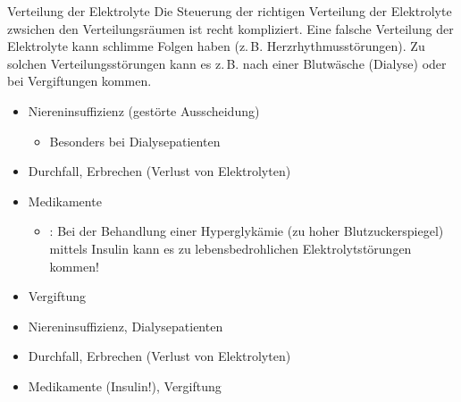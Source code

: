 \documentclass[
ngerman,
paper=a4,
asymmetric,
fontsize=10pt,
draft=false,
numbers=noenddot,
bibtotocnumbered,
footnotes=multiple,
]{scrreprt}
\begin{document}
{Verteilung der Elektrolyte}
{%
Die Steuerung der richtigen Verteilung der
Elektrolyte zwsichen den Verteilungsräumen ist recht
kompliziert.%
% 
Eine
falsche Verteilung der Elektrolyte kann schlimme Folgen
haben (z.\,B. Herzrhythmusstörungen). Zu solchen
Verteilungsstörungen kann es z.\,B. nach einer Blutwäsche
(Dialyse) oder bei Vergiftungen kommen.
 }
{}
{}
{}
{}
 
 
 {%
 \label{topic:elektrolytstoerungen}
 \label{topic:dialyse-elektrolyte}
 \begin{itemize}
     \item Niereninsuffizienz (gestörte Ausscheidung)
     \begin{itemize}
         \item Besonders bei
         Dialysepatienten
     \end{itemize}
     \item Durchfall, Erbrechen (Verlust von Elektrolyten)
     \item Medikamente
     \begin{itemize}
       \item {}: Bei
       der Behandlung einer Hyperglykämie (zu hoher Blutzuckerspiegel) 
       mittels Insulin kann es
       zu lebensbedrohlichen Elektrolytstörungen kommen!
     \end{itemize}
     \item Vergiftung
 \end{itemize}
 }{%
 \begin{itemize}
     \item Niereninsuffizienz, Dialysepatienten
     \item Durchfall, Erbrechen (Verlust von Elektrolyten)
     \item Medikamente (Insulin!), Vergiftung
 \end{itemize}
 }{}{}{}
 
\end{document}
